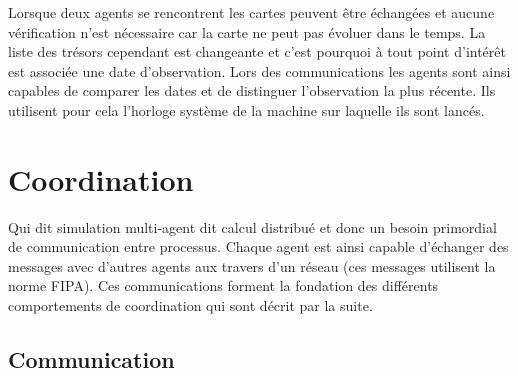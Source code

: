 \documentclass[11pt]{article}
\begin{document}
Lorsque deux agents se rencontrent les cartes peuvent être échangées et aucune vérification n'est nécessaire car la carte ne peut pas évoluer dans le temps. La liste des trésors cependant est changeante et c'est pourquoi à tout point d'intérêt est associée une date d'observation. Lors des communications les agents sont ainsi capables de comparer les dates et de distinguer l'observation la plus récente. Ils utilisent pour cela l'horloge système de la machine sur laquelle ils sont lancés.
\section{Coordination}

Qui dit simulation multi-agent dit calcul distribué et donc un besoin primordial de communication entre processus. Chaque agent est ainsi capable d'échanger des messages avec d'autres agents aux travers d'un réseau (ces messages utilisent la norme FIPA). Ces communications forment la fondation des différents comportements de coordination qui sont décrit par la suite.

\subsection{Communication}
\label{sec-comm}
\end{document}
